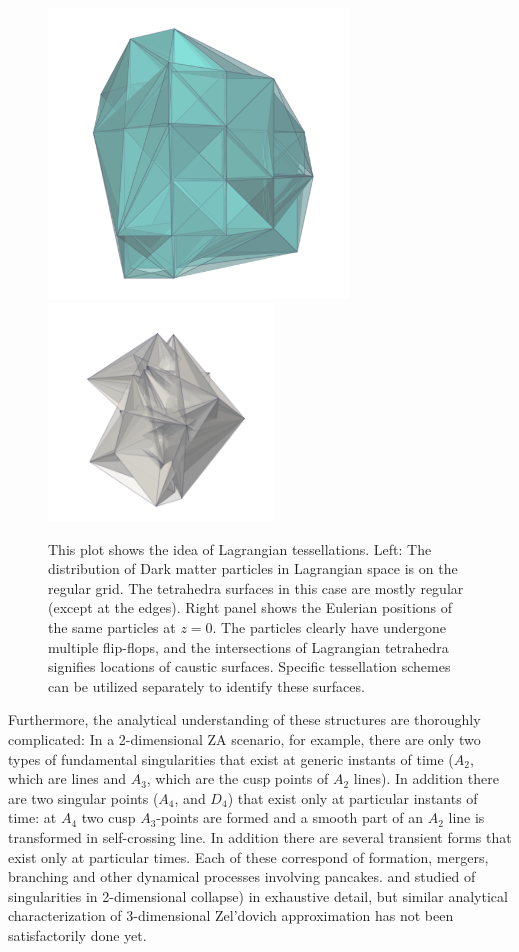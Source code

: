 \begin{figure} 
\centering\includegraphics[width=8cm]{Chapter2/Plots/qDel.png}
\centering\includegraphics[width=6cm]{Chapter2/Plots/x.png}
\caption{ This plot shows the idea of Lagrangian tessellations. Left: The distribution of Dark matter particles in Lagrangian space is on the regular grid. The tetrahedra surfaces in this case are mostly regular (except at the edges). Right panel shows the Eulerian positions of the same particles at $z=0$. The particles clearly have undergone multiple flip-flops, and the intersections of Lagrangian tetrahedra signifies locations of caustic surfaces. Specific tessellation schemes can be utilized separately to identify these surfaces. }
\label{fig:Tess}
\end{figure}


Furthermore, the analytical understanding of these structures are thoroughly complicated: In a 2-dimensional ZA scenario, for example, there are only two types of fundamental singularities that exist at generic instants of time ($A_2$, which are lines and $A_3$, which are the cusp points of $A_2$ lines).   In addition there are two singular points ($A_4$, and $D_4$) that exist  only at particular instants of time: at $A_4$ two cusp $A_3$-points are formed and a smooth part of an $A_2$ line is  transformed in self-crossing
line. In addition there are several transient forms that exist only 
at particular times.
Each of these correspond of formation, mergers, branching and other dynamical processes involving pancakes. \cite{Arnold1982} and \cite{Hidding2014} studied of singularities in 2-dimensional collapse) in exhaustive detail, but similar analytical characterization of 3-dimensional Zel'dovich approximation has not been satisfactorily done yet.  
 
